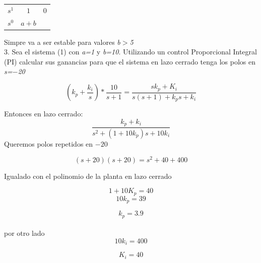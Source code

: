 \documentclass{tufte-handout}
\begin{document}
		\begin{table}[htbp]
	\centering
	\begin{tabular}{c|c c}
	$s^1$ & $1$ & $0$\\
	$s^0$ & $a+b$ &  \\
	\end{tabular}
	\end{table} 
Simpre va a ser estable para valores \emph{b$>$5} \\


3. Sea el sistema (1) con \emph{a=1} y \emph{b=10}. Utilizando un control Proporcional Integral (PI) calcular sus ganancias para que el sistema en lazo cerrado tenga los polos en \emph{s=$-$20} 

	\begin{equation}
	 	(k_p  + \frac{k_i}{s}) * \frac{10}{s+1}= \frac{s k_p + K_i}{s(s+1)+k_p s + k_i} \nonumber
	\end{equation}

 Entonces en lazo cerrado:
 \begin{equation}
    \frac{ k_p + k_i }{ s^2 + ( 1 + 10 k_p )s + 10 k_i } \nonumber	
\end{equation} 
Queremos polos repetidos en $-20$

		\begin{equation}
			(s + 20)(s + 20)= s^2 + 40 + 400 \nonumber
		\end{equation}

		Igualado con el polinomio de la planta en lazo cerrado

\begin{equation}
 			1 + 10 K_p = 40 \nonumber
\end{equation}
		\begin{equation}
			10 k_p = 39 \nonumber
		\end{equation}
				
		\begin{equation}
			k_p = 3.9 \nonumber
\end{equation}
 \\ por otro lado
\begin{equation}
	10 k_i = 400 \nonumber
\end{equation} 

\begin{equation}
		K_i = 40 \nonumber
\end{equation}




\end{document}
